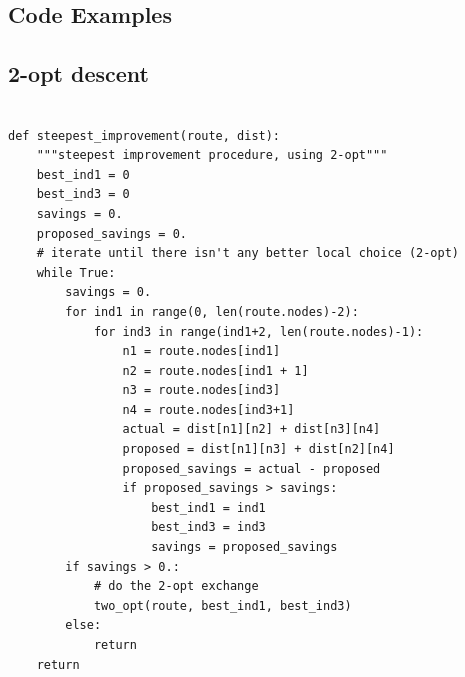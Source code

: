 \documentclass{article} %
\begin{document}
\newpage
\subsection{Code Examples}

\subsection{2-opt descent}
\label{code_steepest_improvement}
\begin{verbatim}

def steepest_improvement(route, dist):
    """steepest improvement procedure, using 2-opt"""
    best_ind1 = 0
    best_ind3 = 0
    savings = 0.
    proposed_savings = 0.
    # iterate until there isn't any better local choice (2-opt)
    while True:
        savings = 0.
        for ind1 in range(0, len(route.nodes)-2):
            for ind3 in range(ind1+2, len(route.nodes)-1):
                n1 = route.nodes[ind1]
                n2 = route.nodes[ind1 + 1]
                n3 = route.nodes[ind3]
                n4 = route.nodes[ind3+1]
                actual = dist[n1][n2] + dist[n3][n4]
                proposed = dist[n1][n3] + dist[n2][n4]
                proposed_savings = actual - proposed
                if proposed_savings > savings:
                    best_ind1 = ind1
                    best_ind3 = ind3
                    savings = proposed_savings
        if savings > 0.:
        	# do the 2-opt exchange
            two_opt(route, best_ind1, best_ind3)
        else:
            return
    return
\end{verbatim}
\end{document}
